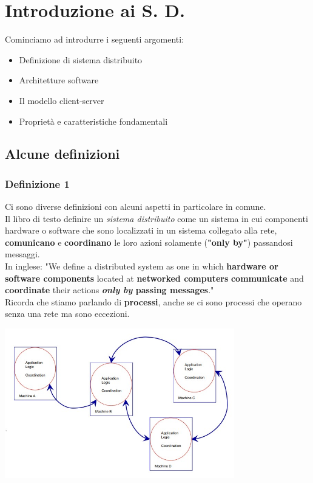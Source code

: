 \chapter{Introduzione ai S. D.}
Cominciamo ad introdurre i seguenti argomenti:
\begin{itemize}
    \item Definizione di sistema distribuito
    \item Architetture software
    \item Il modello client-server
    \item Proprietà e caratteristiche fondamentali    
\end{itemize}
\section{Alcune definizioni}
\subsection{Definizione 1}
Ci sono diverse definizioni con alcuni aspetti in particolare in comune.
\\Il libro di testo definire un \textit{sistema distribuito} come un sistema in cui componenti hardware o software che sono localizzati in un sistema collegato alla rete, \textbf{comunicano} e \textbf{coordinano} le loro azioni solamente (\textbf{"only by"}) passandosi messaggi.
\\In inglese: "We define a distributed system as one in which \textbf{hardware or software components} located at \textbf{networked computers} \textbf{communicate} and \textbf{coordinate} their actions \textbf{\textit{only by} passing messages}."
\\Ricorda che stiamo parlando di \textbf{processi}, anche se ci sono processi che operano senza una rete ma sono eccezioni.
\begin{center}
    \includegraphics[width=0.75\textwidth]{img/lez28022023_def1.jpg}
\end{center}

